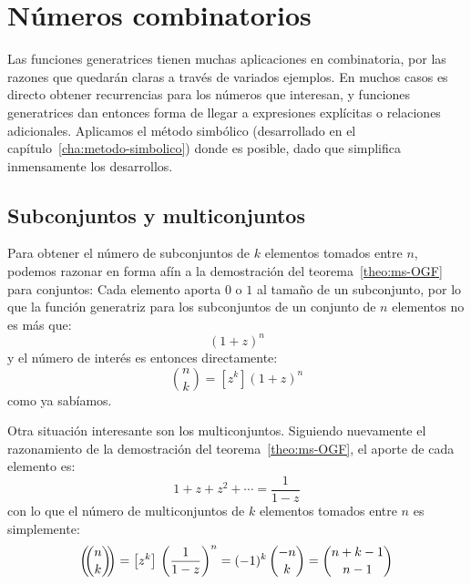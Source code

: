 %

\chapter{Números combinatorios}
\label{cha:numeros-combinatorios}

  Las funciones generatrices tienen muchas aplicaciones en combinatoria,%
  por las razones que quedarán claras
  a través de variados ejemplos.
  En muchos casos es directo obtener recurrencias
  para los números que interesan,
  y funciones generatrices
  dan entonces forma de llegar a expresiones explícitas
  o relaciones adicionales.
  Aplicamos el método simbólico
  (desarrollado en el capítulo~\ref{cha:metodo-simbolico})
  donde es posible,
  dado que simplifica inmensamente los desarrollos.

\section{Subconjuntos y multiconjuntos}
\label{sec:sub+multi-conjuntos}

  Para obtener el número de subconjuntos%
  de \(k\) elementos tomados entre \(n\),
  podemos razonar en forma afín a la demostración
  del teorema~\ref{theo:ms-OGF} para conjuntos:
  Cada elemento aporta \(0\) o \(1\) al tamaño de un subconjunto,
  por lo que la función generatriz
  para los subconjuntos de un conjunto de \(n\) elementos no es más que:
  \begin{equation*}
    (1 + z)^n
  \end{equation*}
  y el número de interés es entonces directamente:
  \begin{equation*}
    \binom{n}{k}
      = \left[ z^k \right] (1 + z)^n
  \end{equation*}
  como ya sabíamos.

  Otra situación interesante son los multiconjuntos.%
  Siguiendo nuevamente el razonamiento de la demostración
  del teorema~\ref{theo:ms-OGF},
  el aporte de cada elemento es:
  \begin{equation*}
    1 + z + z^2 + \dotsb
      = \frac{1}{1 - z}
  \end{equation*}
  con lo que el número de multiconjuntos
  de \(k\) elementos tomados entre \(n\)
  es simplemente:
  \begin{equation*}
    \left( \!\! \binom{n}{k} \!\! \right)
      = \left[ z^k \right] \, \left( \frac{1}{1 - z} \right)^n
      = (-1)^k \, \binom{-n}{k}
      = \binom{n + k - 1}{n - 1}
  \end{equation*}

